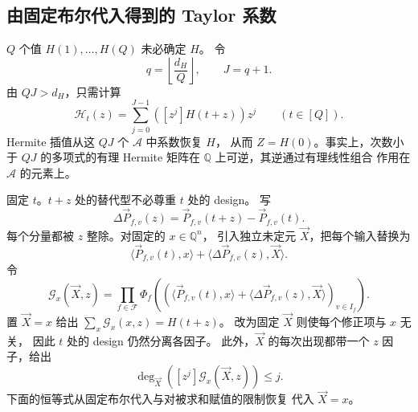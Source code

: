 \documentclass[11pt,reqno]{amsart}
\numberwithin{equation}{section}
\theoremstyle{definition}\newtheorem{definition}[theorem]{定义}
\theoremstyle{remark}\newtheorem{remark}[theorem]{注}
\renewcommand{\le}{\leqslant}
\begin{document}
\subsection{由固定布尔代入得到的 Taylor 系数}
\label{subsec:fixed-boolean-substitutions}
$Q$ 个值 $H(1),\ldots,H(Q)$ 未必确定 $H$。
令
\begin{equation}\label{eq:hasse-order}
 q=\left\lfloor\frac{d_H}{Q}\right\rfloor,\qquad J=q+1.
\end{equation}
由 $QJ>d_H$，只需计算
\begin{equation}\label{eq:taylor-truncation}
 \mathcal H_t(z)=\sum_{j=0}^{J-1}([z^j]H(t+z))z^j
 \qquad(t\in[Q]).
\end{equation}
Hermite 插值从这 $QJ$ 个 $\mathcal A$ 中系数恢复 $H$，
从而 $Z=H(0)$。事实上，次数小于 $QJ$ 的多项式的有理
Hermite 矩阵在 $\mathbb Q$ 上可逆，其逆通过有理线性组合
作用在 $\mathcal A$ 的元素上。

固定 $t$。$t+z$ 处的替代型不必尊重 $t$ 处的 design。
写
\[
 \Delta\vec P_{f,v}(z)=\vec P_{f,v}(t+z)-\vec P_{f,v}(t).
\]
每个分量都被 $z$ 整除。对固定的 $x\in\mathbb Q^n$，
引入独立未定元 $\vec X$，把每个输入替换为
\begin{equation}\label{eq:jet-substitution}
 \langle\vec P_{f,v}(t),x\rangle
       +\langle\Delta\vec P_{f,v}(z),\vec X\rangle.
\end{equation}
令
\begin{equation}\label{eq:auxiliary-polynomial}
 \mathcal G_x(\vec X,z)=\prod_{f\in\mathcal F}
 \Phi_f\!\left(
  (\langle\vec P_{f,v}(t),x\rangle+
   \langle\Delta\vec P_{f,v}(z),\vec X\rangle)_{v\in I_f}\right).
\end{equation}
置 $\vec X=x$ 给出
$\sum_x\mathcal G_x(x,z)=H(t+z)$。
改为固定 $\vec X$ 则使每个修正项与 $x$ 无关，
因此 $t$ 处的 design 仍然分离各因子。
此外，$\vec X$ 的每次出现都带一个 $z$ 因子，给出
\begin{equation}\label{eq:degree-cost}
 \deg_{\vec X}([z^j]\mathcal G_x(\vec X,z))\le j.
\end{equation}
下面的恒等式从固定布尔代入与对被求和赋值的限制恢复
代入 $\vec X=x$。
\end{document}
